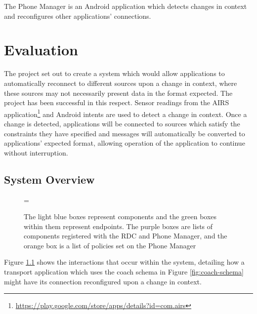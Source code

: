 \documentclass[12pt,twoside,notitlepage]{report}
\begin{document}
The Phone Manager is an Android application which detects changes in context and reconfigures other applications' connections. 

\cleardoublepage


\chapter{Evaluation}

The project set out to create a system which would allow applications to automatically reconnect to different sources upon a change in context, where these sources may not necessarily present data in the format expected. 
The project has been successful in this respect. Sensor readings from the AIRS application\footnote{\url{https://play.google.com/store/apps/details?id=com.airs}} and Android intents are used to detect a change in context. 
Once a change is detected, applications will be connected to sources which satisfy the constraints they have specified and messages will automatically be converted to applications' expected format, allowing operation of the application to continue without interruption.

\section{System Overview}

\begin{figure}[tbh]
\epsfxsize=\hsize
\centerline{}
\caption[System Overview]{The light blue boxes represent components and the green boxes within them represent endpoints. The purple boxes are lists of components registered with the RDC and Phone Manager, and the orange box is a list of policies set on the Phone Manager}
\label{fig:system_overview}
\end{figure}

Figure \ref{fig:system_overview} shows the interactions that occur within the system, detailing how a transport application which uses the coach schema in Figure \ref{fig:coach-schema} might have its connection reconfigured upon a change in context.
\end{document}
